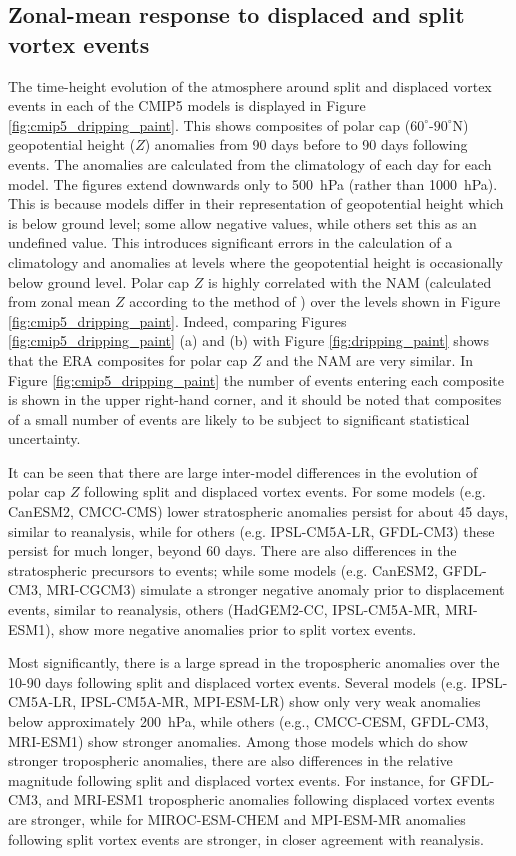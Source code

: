 \subsection{Zonal-mean response to displaced and split vortex events}

The time-height evolution of the atmosphere around split and displaced vortex
events in each of the CMIP5 models is displayed in Figure
\ref{fig:cmip5_dripping_paint}. This shows composites of polar cap
($60^{\circ}$-$90^{\circ}$N) geopotential height ($Z$) anomalies from 90 days
before to 90 days following events. The anomalies are calculated from the
climatology of each day for each model. The figures extend downwards only to
500~hPa (rather than 1000~hPa). This is because models differ in their
representation of geopotential height which is below ground level; some allow
negative values, while others set this as an undefined value. This introduces
significant errors in the calculation of a climatology and anomalies at levels
where the geopotential height is occasionally below ground level. Polar cap $Z$
is highly correlated with the NAM (calculated from zonal mean $Z$ according to
the method of \citet{Baldwin2009}) over the levels shown in Figure
\ref{fig:cmip5_dripping_paint}. Indeed, comparing Figures
\ref{fig:cmip5_dripping_paint} (a) and (b) with Figure \ref{fig:dripping_paint}
shows that the ERA composites for polar cap $Z$ and the NAM are very similar. In
Figure \ref{fig:cmip5_dripping_paint} the number of events entering each
composite is shown in the upper right-hand corner, and it should be noted that
composites of a small number of events are likely to be subject to significant
statistical uncertainty.

It can be seen that there are large inter-model differences in the evolution of
polar cap $Z$ following split and displaced vortex events. For some models
(e.g. CanESM2, CMCC-CMS) lower stratospheric anomalies persist for about 45
days, similar to reanalysis, while for others (e.g. IPSL-CM5A-LR, GFDL-CM3)
these persist for much longer, beyond 60 days. There are also differences in the
stratospheric precursors to events; while some models (e.g. CanESM2, GFDL-CM3,
MRI-CGCM3) simulate a stronger negative anomaly prior to displacement events,
similar to reanalysis, others (HadGEM2-CC, IPSL-CM5A-MR, MRI-ESM1), show more
negative anomalies prior to split vortex events. 

Most significantly, there is a large spread in the tropospheric anomalies over
the 10-90 days following split and displaced vortex events. Several models
(e.g. IPSL-CM5A-LR, IPSL-CM5A-MR, MPI-ESM-LR) show only very weak anomalies
below approximately 200~hPa, while others (e.g., CMCC-CESM, GFDL-CM3, MRI-ESM1)
show stronger anomalies. Among those models which do show stronger tropospheric
anomalies, there are also differences in the relative magnitude following split
and displaced vortex events. For instance, for GFDL-CM3, and MRI-ESM1
tropospheric anomalies following displaced vortex events are stronger, while for
MIROC-ESM-CHEM and MPI-ESM-MR anomalies following split vortex events are
stronger, in closer agreement with reanalysis. 

